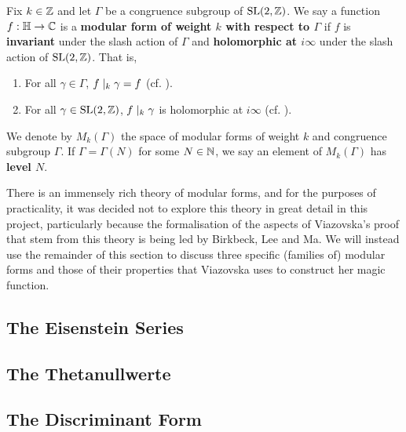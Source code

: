 \begin{boxdefinition}
    Fix $k \in \mathbb{Z}$ and let $\Gamma$ be a congruence subgroup of $\operatorname{SL}\!\left( 2, \mathbb{Z} \right)$. We say a function $f : \mathbb{H} \to \mathbb{C}$ is a \textbf{modular form of weight $k$ with respect to $\Gamma$} if $f$ is \textbf{invariant} under the slash action of $\Gamma$ and \textbf{holomorphic at $i\infty$} under the slash action of $\operatorname{SL}\!\left( 2, \mathbb{Z} \right)$. That is,
    \begin{enumerate}
        \item For all $\gamma \in \Gamma$, $f \mid_k \gamma = f$ (cf. ).
        \item For all $\gamma \in \operatorname{SL}\!\left( 2, \mathbb{Z} \right)$, $f \mid_k \gamma$ is holomorphic at $i\infty$ (cf. ).
    \end{enumerate}
    We denote by $M_k(\Gamma)$ the space of modular forms of weight $k$ and congruence subgroup $\Gamma$. If $\Gamma = \Gamma(N)$ for some $N \in \mathbb{N}$, we say an element of $M_k(\Gamma)$ has \textbf{level $N$}.
\end{boxdefinition}

There is an immensely rich theory of modular forms, and for the purposes of practicality, it was decided not to explore this theory in great detail in this project, particularly because the formalisation of the aspects of Viazovska's proof that stem from this theory is being led by Birkbeck, Lee and Ma. We will instead use the remainder of this section to discuss three specific (families of) modular forms and those of their properties that Viazovska uses to construct her magic function.

\subsection{The Eisenstein Series}

\subsection{The Thetanullwerte}

\subsection{The Discriminant Form}